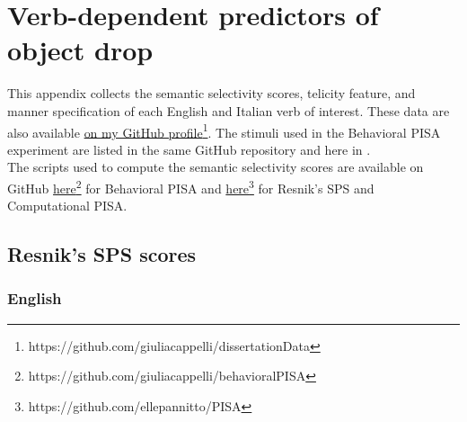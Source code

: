 \setchapterpreamble[u]{\margintoc}
\chapter{Verb-dependent predictors of object drop}


This appendix collects the semantic selectivity scores, telicity feature, and manner specification of each English and Italian verb of interest. These data are also available \href{https://github.com/giuliacappelli/dissertationData}{on my GitHub profile}\footnote{https://github.com/giuliacappelli/dissertationData}. The stimuli used in the Behavioral PISA experiment are listed in the same GitHub repository and here in .\\
The scripts used to compute the semantic selectivity scores are available on GitHub  \href{https://github.com/giuliacappelli/behavioralPISA}{here}\footnote{https://github.com/giuliacappelli/behavioralPISA} for Behavioral PISA and \href{https://github.com/ellepannitto/PISA}{here}\footnote{https://github.com/ellepannitto/PISA} for Resnik's SPS and Computational PISA.


\section{Resnik's SPS scores} 

\subsection{English}


